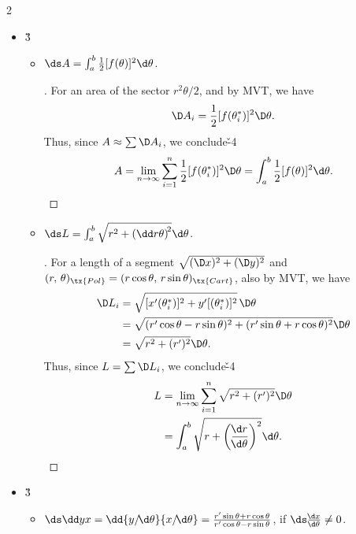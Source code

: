 \documentclass[dvipdfmx,a4paper,titlepage,9pt]{jsarticle}
\begin{document}
\begin{multicols*}{2}
\begin{itemize}
\item[-]  \v3
\begin{itemize}[label={$\cdot$}]
\setlength{\leftskip}{-10pt}
\item $\ds A=\int_a^b\frac12[f(\theta)]^2\d\theta$.
\begin{pfbox}
\begin{proof}[]
For an area of the sector $r^2\theta/2$, and by MVT, we have
$$\D A_i=\frac12[f(\theta_i^*)]^2\D\theta.$$
Thus, since $A\approx\sum\D A_i$, we conclude\v{-4}
$$A=\lim_{n\to\infty}\sum_{i=1}^n\frac12[f(\theta_i^*)]^2\D\theta=\int_a^b\frac12[f(\theta)]^2\d\theta.$$
\end{proof}
\end{pfbox}
\vfill\null\columnbreak
\item $\ds L=\int_a^b\sqrt{r^2+\left(\dd r\theta\right)^{\!2}}\d\theta$.
\begin{pfbox}
\begin{proof}[]
For a length of a segment $\sqrt{(\D x)^2+(\D y)^2}$ and $(r,\,\theta)_{\tx{Pol}}=(r\cos\theta,\,r\sin\theta)_{\tx{Cart}}$, also by MVT, we have
$$\begin{aligned}
  \D L_i&=\sqrt{[x'(\theta^*_i)]^2+y'[(\theta^*_i)]^2}\,\D\theta \\
        &=\sqrt{(r'\cos\theta-r\sin\theta)^2+(r'\sin\theta+r\cos\theta)^2}\D\theta \\
        &=\sqrt{r^2+(r')^2}\D\theta.
  \end{aligned}$$
Thus, since $L=\sum\D L_i$, we conclude\v{-4}
$$\begin{aligned}
  L&=\lim_{n\to\infty}\sum_{i=1}^n\sqrt{r^2+(r')^2}\D\theta \\
   &=\int_a^b\sqrt{r+\left(\frac{\!\d r}{\!\d\theta}\right)^2}\d\theta.
   \end{aligned}$$
\end{proof}
\end{pfbox}
\end{itemize}

\;

\item[-]  \v3
\begin{itemize}
\setlength{\leftskip}{-10pt}
\item[$\cdot$] $\ds\dd yx=\dd{y/\!\d\theta}{x/\!\d\theta}=\frac{r'\sin\theta+r\cos\theta}{r'\cos\theta-r\sin\theta}$, \;if $\ds\frac{\!\d x}{\!\d\theta}\neq0$. \\
\end{itemize}
\end{itemize}


\end{multicols*}
\end{document}
